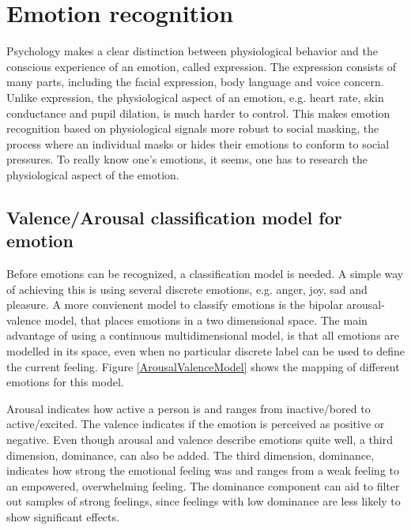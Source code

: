 \section{Emotion recognition}

Psychology makes a clear distinction between physiological behavior and the conscious experience of an emotion, called expression\cite{ExtendedPaper}. The expression consists of many parts, including the facial expression, body language and voice concern\citep{EMSpeech}. Unlike expression, the physiological aspect of an emotion, e.g. heart rate, skin conductance and pupil dilation, is much harder to control. This makes emotion recognition based on physiological signals more robust to social masking\citep{PhytoEm}, the process where an individual masks or hides their emotions to conform to social pressures. To really know one's emotions, it seems, one has to research the physiological aspect of the emotion.

\subsection{Valence/Arousal classification model for emotion}
\label{valarrdomspace}

Before emotions can be recognized, a classification model is needed. A simple way of achieving this is using several discrete emotions, e.g. anger, joy, sad and pleasure. A more convienent model to classify emotions is the bipolar arousal-valence model\cite{ExtendedPaper,RealTimeEEGEmotion}, that places emotions in a two dimensional space. The main advantage of using a continuous multidimensional model, is that all emotions are modelled in its space, even when no particular discrete label can be used to define the current feeling. Figure \ref{ArousalValenceModel} shows the mapping of different emotions for this model. 

\npar

 Arousal indicates how active a person is and ranges from inactive/bored to active/excited. The valence indicates if the emotion is perceived as positive or negative. Even though arousal and valence describe emotions quite well, a third dimension, dominance, can also be added. The third dimension, dominance, indicates how strong the emotional feeling was and ranges from a weak feeling to an empowered, overwhelming feeling. The dominance component can aid to filter out samples of strong feelings, since feelings with low dominance are less likely to show significant effects.

